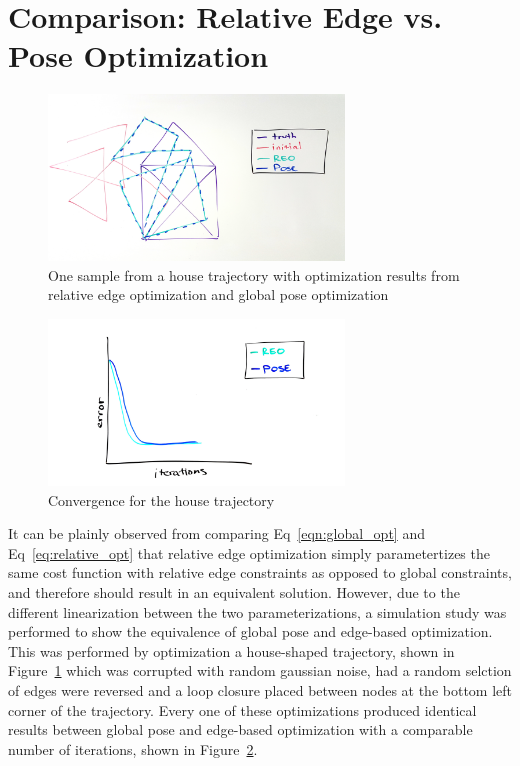 
\section{Comparison: Relative Edge vs. Pose Optimization}

\begin{figure}
  \includegraphics[width=0.7\textwidth]{figures/house_trajectory.jpg}
  \caption{One sample from a house trajectory with optimization results from relative edge optimization and global pose optimization}
  \label{fig:house_trajectory}
\end{figure}

\begin{figure}
  \includegraphics[width=0.7\textwidth]{figures/convergence_comparison_house.jpg}
  \caption{Convergence for the house trajectory}
  \label{fig:convergence_house}
\end{figure}

It can be plainly observed from comparing Eq~\ref{eqn:global_opt} and Eq~\ref{eq:relative_opt} that relative edge optimization simply parametertizes the same cost function with relative edge constraints as opposed to global constraints, and therefore should result in an equivalent solution.  However, due to the different linearization between the two parameterizations, a simulation study was performed to show the equivalence of global pose and edge-based optimization. This was performed by optimization a house-shaped trajectory, shown in Figure~\ref{fig:house_trajectory} which was corrupted with random gaussian noise, had a random selction of edges were reversed and a loop closure placed between nodes at the bottom left corner of the trajectory. Every one of these optimizations produced identical results between global pose and edge-based optimization with a comparable number of iterations, shown in Figure~\ref{fig:convergence_house}.

